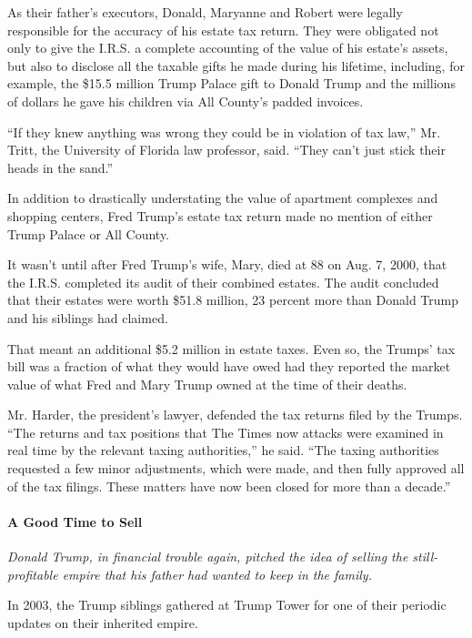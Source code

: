 As their father's executors, Donald, Maryanne and Robert were legally
responsible for the accuracy of his estate tax return. They were
obligated not only to give the I.R.S. a complete accounting of the value
of his estate's assets, but also to disclose all the taxable gifts he
made during his lifetime, including, for example, the \$15.5 million
Trump Palace gift to Donald Trump and the millions of dollars he gave
his children via All County's padded invoices.

``If they knew anything was wrong they could be in violation of tax
law,'' Mr. Tritt, the University of Florida law professor, said. ``They
can't just stick their heads in the sand.''

In addition to drastically understating the value of apartment complexes
and shopping centers, Fred Trump's estate tax return made no mention of
either Trump Palace or All County.

It wasn't until after Fred Trump's wife, Mary, died at 88 on Aug. 7,
2000, that the I.R.S. completed its audit of their combined estates. The
audit concluded that their estates were worth \$51.8 million, 23 percent
more than Donald Trump and his siblings had claimed.

That meant an additional \$5.2 million in estate taxes. Even so, the
Trumps' tax bill was a fraction of what they would have owed had they
reported the market value of what Fred and Mary Trump owned at the time
of their deaths.

Mr. Harder, the president's lawyer, defended the tax returns filed by
the Trumps. ``The returns and tax positions that The Times now attacks
were examined in real time by the relevant taxing authorities,'' he
said. ``The taxing authorities requested a few minor adjustments, which
were made, and then fully approved all of the tax filings. These matters
have now been closed for more than a decade.''

\hypertarget{a-good-time-to-sell}{%
\paragraph{A Good Time to Sell}\label{a-good-time-to-sell}}

\emph{Donald Trump, in financial trouble again, pitched the idea of
selling the still-profitable empire that his father had wanted to keep}
\emph{in the family.}

In 2003, the Trump siblings gathered at Trump Tower for one of their
periodic updates on their inherited empire.

